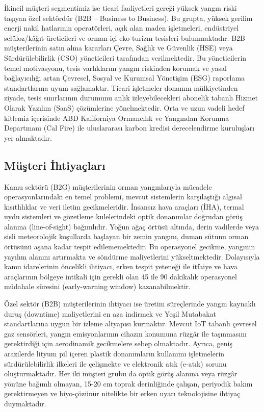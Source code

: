 \documentclass[11pt,a4paper]{article}
\begin{document}
İkincil müşteri segmentimiz ise ticari faaliyetleri gereği yüksek yangın riski taşıyan özel sektördür (B2B -- Business to Business). Bu grupta, yüksek gerilim enerji nakil hatlarının operatörleri, açık alan maden işletmeleri, endüstriyel selüloz/kâğıt üreticileri ve orman içi eko-turizm tesisleri bulunmaktadır. B2B müşterilerinin satın alma kararları Çevre, Sağlık ve Güvenlik (HSE) veya Sürdürülebilirlik (CSO) yöneticileri tarafından verilmektedir. Bu yöneticilerin temel motivasyonu, tesis varlıklarını yangın riskinden korumak ve yasal bağlayıcılığı artan Çevresel, Sosyal ve Kurumsal Yönetişim (ESG) raporlama standartlarına uyum sağlamaktır. Ticari işletmeler donanım mülkiyetinden ziyade, tesis sınırlarının durumunu anlık izleyebilecekleri abonelik tabanlı Hizmet Olarak Yazılım (SaaS) çözümlerine yönelmektedir. Orta ve uzun vadeli hedef kitlemiz içerisinde ABD Kaliforniya Ormancılık ve Yangından Korunma Departmanı (Cal Fire) ile uluslararası karbon kredisi derecelendirme kuruluşları yer almaktadır.

\subsection{Müşteri İhtiyaçları}

Kamu sektörü (B2G) müşterilerinin orman yangınlarıyla mücadele operasyonlarındaki en temel problemi, mevcut sistemlerin karşılaştığı algısal kısıtlılıklar ve veri iletim gecikmeleridir. İnsansız hava araçları (İHA), termal uydu sistemleri ve gözetleme kulelerindeki optik donanımlar doğrudan görüş alanına (line-of-sight) bağımlıdır. Yoğun ağaç örtüsü altında, derin vadilerde veya sisli meteorolojik koşullarda başlayan bir zemin yangını, duman sütunu orman örtüsünü aşana kadar tespit edilememektedir. Bu operasyonel gecikme, yangının yayılım alanını artırmakta ve söndürme maliyetlerini yükseltmektedir. Dolayısıyla kamu idarelerinin öncelikli ihtiyacı, erken tespit yeteneği ile itfaiye ve hava araçlarının bölgeye intikali için gerekli olan 45 ile 90 dakikalık operasyonel müdahale süresini (early-warning window) kazanabilmektir.

Özel sektör (B2B) müşterilerinin ihtiyacı ise üretim süreçlerinde yangın kaynaklı duruş (downtime) maliyetlerini en aza indirmek ve Yeşil Mutabakat standartlarına uygun bir izleme altyapısı kurmaktır. Mevcut IoT tabanlı çevresel gaz sensörleri, yangın emisyonlarının cihazın konumuna rüzgâr ile taşınmasını gerektirdiği için aerodinamik gecikmelere sebep olmaktadır. Ayrıca, geniş arazilerde lityum pil içeren plastik donanımların kullanımı işletmelerin sürdürülebilirlik ilkeleri ile çelişmekte ve elektronik atık (e-atık) sorunu oluşturmaktadır. Her iki müşteri grubu da optik görüş alanına veya rüzgâr yönüne bağımlı olmayan, 15-20 cm toprak derinliğinde çalışan, periyodik bakım gerektirmeyen ve biyo-çözünür nitelikte bir erken uyarı teknolojisine ihtiyaç duymaktadır.
\end{document}
